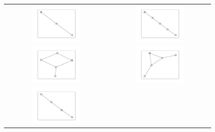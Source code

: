 \documentclass[12pt, a4paper]{extarticle}
\begin{document}
\begin{figure}\centering\begin{tabularx}{\textwidth}{cc}
\includegraphics[width=0.5\textwidth]{task11-graphlets/3_18-19-23.pdf} &
\includegraphics[width=0.5\textwidth]{task11-graphlets/5_14-16-13-18-23.pdf} \\
\includegraphics[width=0.5\textwidth]{task11-graphlets/5_14-21-18-22-23.pdf} &
\includegraphics[width=0.5\textwidth]{task11-graphlets/5_16-21-25-20-23.pdf} \\
\includegraphics[width=0.5\textwidth]{task11-graphlets/4_18-25-23-26.pdf} &

\end{tabularx}
\end{figure}
\end{document}
